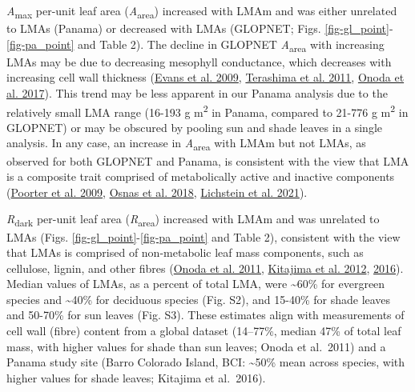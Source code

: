 \documentclass[
  12pt,
  letterpaper,
  DIV=11,
  numbers=noendperiod]{scrartcl}
\begin{document}
\emph{A}\textsubscript{max} per-unit leaf area
(\emph{A}\textsubscript{area}) increased with LMAm and was either
unrelated to LMAs (Panama) or decreased with LMAs (GLOPNET; Figs.
\ref{fig-gl_point}-\ref{fig-pa_point} and Table 2). The decline in
GLOPNET \emph{A}\textsubscript{area} with increasing LMAs may be due to
decreasing mesophyll conductance, which decreases with increasing cell
wall thickness (\protect\hyperlink{ref-Evans2009}{Evans et al. 2009},
\protect\hyperlink{ref-Terashima2011}{Terashima et al. 2011},
\protect\hyperlink{ref-Onoda2017}{Onoda et al. 2017}). This trend may be
less apparent in our Panama analysis due to the relatively small LMA
range (16-193 g m\textsuperscript{2} in Panama, compared to 21-776 g
m\textsuperscript{2} in GLOPNET) or may be obscured by pooling sun and
shade leaves in a single analysis. In any case, an increase in
\emph{A}\textsubscript{area} with LMAm but not LMAs, as observed for
both GLOPNET and Panama, is consistent with the view that LMA is a
composite trait comprised of metabolically active and inactive
components (\protect\hyperlink{ref-Poorter2009}{Poorter et al. 2009},
\protect\hyperlink{ref-Osnas2018}{Osnas et al. 2018},
\protect\hyperlink{ref-Lichstein2021}{Lichstein et al. 2021}).

\emph{R}\textsubscript{dark} per-unit leaf area
(\emph{R}\textsubscript{area}) increased with LMAm and was unrelated to
LMAs (Figs. \ref{fig-gl_point}-\ref{fig-pa_point} and Table 2),
consistent with the view that LMAs is comprised of non-metabolic leaf
mass components, such as cellulose, lignin, and other fibres
(\protect\hyperlink{ref-Onoda2011}{Onoda et al. 2011},
\protect\hyperlink{ref-Kitajima2012}{Kitajima et al. 2012},
\protect\hyperlink{ref-Kitajima2016}{2016}). Median values of LMAs, as a
percent of total LMA, were \textasciitilde60\% for evergreen species and
\textasciitilde40\% for deciduous species (Fig. S2), and 15-40\% for
shade leaves and 50-70\% for sun leaves (Fig. S3). These estimates align
with measurements of cell wall (fibre) content from a global dataset
(14--77\%, median 47\% of total leaf mass, with higher values for shade
than sun leaves; Onoda et al.~2011) and a Panama study site (Barro
Colorado Island, BCI: \textasciitilde50\% mean across species, with
higher values for shade leaves; Kitajima et al.~2016).
\end{document}

